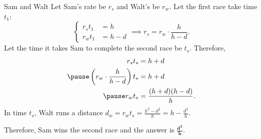 \documentclass[xcolor=dvipsnames, fontsize=11pt, %
pagesize, %
parskip=half-, t]{beamer}
\begin{document}
\begin{frame}{Sam and Walt}
	Let Sam's rate be $r_s$ and Walt's be $r_w$. Let the first race take time $t_1$: 
$$	\begin{cases} r_st_1&=h \\
			r_wt_1&=h-d \end{cases} \implies r_s=r_w\cdot \frac{h}{h-d}.$$
Let the time it takes Sam to complete the second race be $t_s$. Therefore, \begin{align*} r_st_s&=h+d \\ \pause 
\left(r_w\cdot \frac{h}{h-d}\right)t_s &=h+d \\  \pause
r_wt_s &=\frac{(h+d)(h-d)}{h}. \end{align*}
In time $t_s$, Walt runs a distance $d_w=r_wt_s=\frac{h^2-d^2}{h}=h-\frac{d^2}{h}$. \medskip \pause

Therefore, Sam wins the second race and the answer is $\bm{\frac{d^2}{h}}.$
\end{frame}
\end{document}
